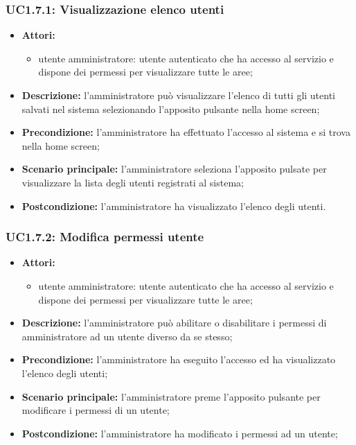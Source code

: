 \subsubsection{UC1.7.1: Visualizzazione elenco utenti}
\begin{itemize}
	\item \textbf{Attori:}
	\begin{itemize}
		\item utente amministratore: utente autenticato che ha accesso al servizio e dispone dei permessi per visualizzare tutte le aree;
	\end{itemize}
	\item \textbf{Descrizione:} l'amministratore può visualizzare l'elenco di tutti gli utenti salvati nel sistema selezionando l'apposito pulsante nella home screen;
	\item \textbf{Precondizione:} l'amministratore ha effettuato l'accesso al sistema e si trova nella home screen;
	\item \textbf{Scenario principale:} l'amministratore seleziona l'apposito pulsate per visualizzare la lista degli utenti registrati al sistema;
	\item \textbf{Postcondizione:} l'amministratore ha visualizzato l'elenco degli utenti.
\end{itemize}

\subsubsection{UC1.7.2: Modifica permessi utente}
\begin{itemize}
	\item \textbf{Attori:}
	\begin{itemize}
		\item utente amministratore: utente autenticato che ha accesso al servizio e dispone dei permessi per visualizzare tutte le aree;
	\end{itemize}
	\item \textbf{Descrizione:} l'amministratore può abilitare o disabilitare i permessi di amministratore ad un utente diverso da se stesso;
	\item \textbf{Precondizione:} l'amministratore ha eseguito l'accesso ed ha visualizzato l'elenco degli utenti;
	\item \textbf{Scenario principale:} l'amministratore preme l'apposito pulsante per modificare i permessi di un utente;
	\item \textbf{Postcondizione:} l'amministratore ha modificato i permessi ad un utente;
\end{itemize}

